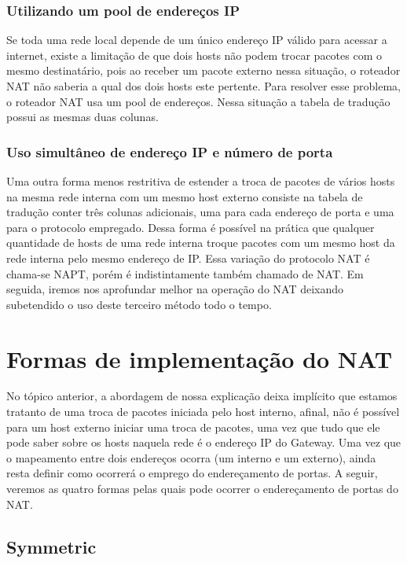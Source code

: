 \documentclass[
	12pt,				%
	oneside,			%
	a4paper,			%
	english,			%
	brazil,				%
	]{ime-abntex2}
\begin{document}
\subsubsection{Utilizando um pool de endereços IP}

Se toda uma rede local depende de um único endereço IP válido para acessar a internet, existe a limitação
de que dois hosts não podem trocar pacotes com o mesmo destinatário, pois ao receber um pacote externo nessa
situação, o roteador NAT não saberia a qual dos dois hosts este pertente. Para resolver esse problema, o roteador
NAT usa um pool de endereços. Nessa situação a tabela de tradução possui as mesmas duas colunas.

\subsubsection{Uso simultâneo de endereço IP e número de porta}

Uma outra forma menos restritiva de estender a troca de pacotes de vários hosts na mesma rede interna com um
mesmo host externo consiste na tabela de tradução conter três colunas adicionais, uma para cada endereço de porta
e uma para o protocolo empregado. Dessa forma é possível na prática que qualquer quantidade de hosts de uma rede interna
troque pacotes com um mesmo host da rede interna pelo mesmo endereço de IP. Essa variação do protocolo NAT é chama-se
NAPT, porém é indistintamente também chamado de NAT. Em seguida, iremos nos aprofundar melhor na operação do NAT
deixando subetendido o uso deste terceiro método todo o tempo.

\section{Formas de implementação do NAT}

No tópico anterior, a abordagem de nossa explicação deixa implícito que estamos tratanto de uma troca de
pacotes iniciada pelo host interno, afinal, não é possível para um host externo iniciar uma troca de pacotes, uma vez que
tudo que ele pode saber sobre os hosts naquela rede é o endereço IP do Gateway. Uma vez que o mapeamento entre
dois endereços ocorra (um interno e um externo), ainda resta definir como ocorrerá o emprego do endereçamento de
portas. A seguir, veremos as quatro formas pelas quais pode ocorrer o endereçamento de portas do NAT.


\subsection{Symmetric}
\end{document}

